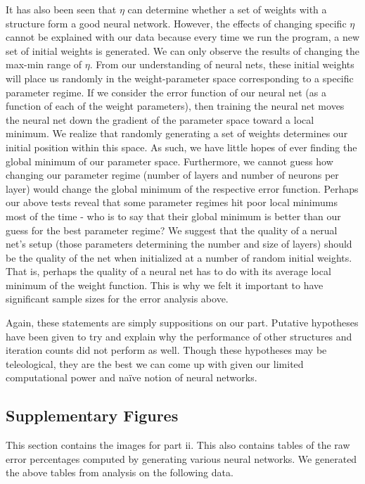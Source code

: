 \documentclass[12pt]{article}
\begin{document}
It has also been seen that $\eta$ can determine whether a set of weights with a structure form a good neural network.
However, the effects of changing specific $\eta$ cannot be explained with our data because every time we run the program, a new set of initial weights is generated. We can only observe the results of changing the max-min range of $\eta$. From our understanding of neural nets, these initial weights will place us randomly in the weight-parameter space corresponding to a specific parameter regime. If we consider the error function of our neural net (as a function of each of the weight parameters), then training the neural net moves the neural net down the gradient of the parameter space toward a local minimum. We realize that randomly generating a set of weights determines our initial position within this space. As such, we have little hopes of ever finding the global minimum of our parameter space. Furthermore, we cannot guess how changing our parameter regime (number of layers and number of neurons per layer) would change the global minimum of the respective error function. Perhaps our above tests reveal that some parameter regimes hit poor local minimums most of the time - who is to say that their global minimum is better than our guess for the best parameter regime? We suggest that the quality of a nerual net's setup (those parameters determining the number and size of layers) should be the quality of the net when initialized at a number of random initial weights. That is, perhaps the quality of a neural net has to do with its average local minimum of the weight function. This is why we felt it important to have significant sample sizes for the error analysis above.


Again, these statements are simply suppositions on our part. Putative hypotheses have been given to try and explain why the performance of other structures and iteration counts did not perform as well.
Though these hypotheses may be teleological, they are the best we can come up with given our limited computational power and na\"ive notion of neural networks.

\subsection*{Supplementary Figures}
This section contains the images for part ii. This also contains tables of the raw error percentages computed by generating various neural networks.
We generated the above tables from analysis on the following data.\\
\end{document}
